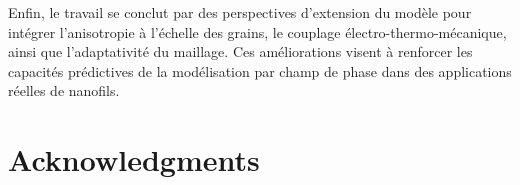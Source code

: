 Enfin, le travail se conclut par des perspectives d’extension du modèle pour intégrer l’anisotropie à l’échelle des grains, le couplage électro-thermo-mécanique, ainsi que l’adaptativité du maillage. Ces améliorations visent à renforcer les capacités prédictives de la modélisation par champ de phase dans des applications réelles de nanofils.
\chapter*{Acknowledgments}






